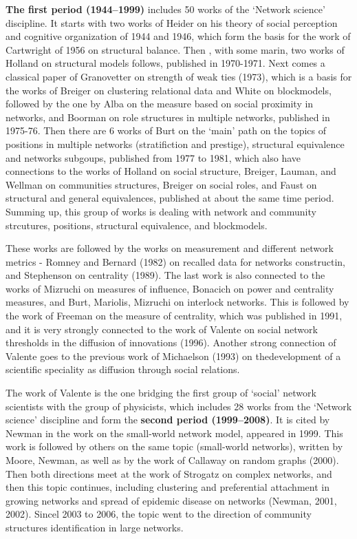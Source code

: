 \documentclass[11pt]{article} %
\begin{document}
\textbf{The first period (1944--1999)} includes 50 works of the `Network science' discipline. It starts with two works of Heider on his theory of social perception and cognitive organization of 1944 and 1946, which form the basis for the work of Cartwright of 1956 on structural balance. Then , with some marin, two works of Holland on structural models follows, published in 1970-1971. Next comes a classical paper of Granovetter on strength of weak ties (1973), which is a basis for the works of Breiger on clustering relational data and White on blockmodels, followed by the one by Alba on the measure based on social proximity in networks, and Boorman on role structures in multiple networks, published in 1975-76. Then there are 6 works of Burt on the `main' path on the topics of positions in multiple networks (stratifiction and prestige), structural equivalence and networks subgoups, published from 1977 to 1981, which also have connections to  the works of Holland on social structure, Breiger, Lauman, and Wellman on communities structures, Breiger on social roles, and Faust on structural and general equivalences, published at about the same time period. Summing up, this group of works is dealing with network and community strcutures, positions, structural equivalence, and blockmodels.  \medskip 

These works are followed by the works on measurement and different network metrics - Romney and Bernard (1982) on recalled data for networks constructin, and Stephenson on centrality (1989). The last work is also connected to the works of Mizruchi on measures of influence, Bonacich on power and centrality measures, and Burt, Mariolis, Mizruchi on interlock networks. This is followed by the work of Freeman on the measure of centrality, which was published in 1991, and it is very strongly connected to the work of Valente on social network thresholds in the diffusion of innovations (1996). Another strong connection of Valente goes to the previous work of Michaelson (1993) on thedevelopment of a scientific speciality as diffusion through social relations.  \medskip 

The work of Valente is the one bridging the first group of `social' network scientists with the group of physicists, which includes 28 works from the `Network science' discipline and form the \textbf{second period (1999--2008)}. It is cited by Newman in the work on the small-world network model, appeared in 1999. This work is followed by others on the same topic (small-world networks), written by Moore, Newman, as well as by the work of Callaway on random graphs (2000). Then both directions meet at the work of Strogatz on complex networks, and then this topic continues, including 
clustering and preferential attachment in growing networks and spread of epidemic disease on networks (Newman, 2001, 2002). Sincel 2003 to 2006, the topic went to the direction of community structures identification in large networks. \medskip 
 
\end{document}
